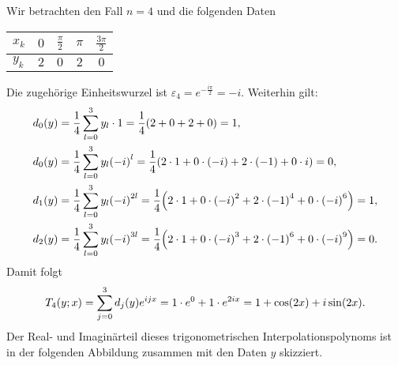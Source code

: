 \documentclass{lecture}
\begin{document}
    \begin{example}
        Wir betrachten den Fall \(n = 4\) und die folgenden Daten
        \begin{center}
            \begin{tabular}{lcccc}
                \toprule
                \(x_k\) & \(0\) & \(\frac{\pi}{2}\) & \(\pi\) & \(\frac{3\pi}{2}\)\\
                \midrule
                \(y_k\) & \(2\) & \(0\) & \(2\) & \(0\)\\
                \bottomrule
            \end{tabular}
        \end{center}
        Die zugehörige Einheitswurzel ist \(\varepsilon_4 = e^{-\frac{i\pi}{2}} = -i\).
        Weiterhin gilt:
        \begin{align*}
            d_0\parentheses*{y} &= \frac{1}{4}\sum_{l = 0}^3 y_l \cdot 1 = \frac{1}{4}\parentheses*{2 + 0 + 2 + 0} = 1,\\
            d_0\parentheses*{y} &= \frac{1}{4}\sum_{l = 0}^3 y_l\parentheses*{-i}^l = \frac{1}{4}\parentheses*{2 \cdot 1 + 0 \cdot \parentheses*{-i} + 2 \cdot \parentheses*{-1} + 0 \cdot i} = 0,\\
            d_1\parentheses*{y} &= \frac{1}{4}\sum_{l = 0}^3 y_l\parentheses*{-i}^{2l} = \frac{1}{4}\parentheses*{2 \cdot 1 + 0 \cdot \parentheses*{-i}^2 + 2 \cdot \parentheses*{-1}^4 + 0 \cdot \parentheses*{-i}^6} = 1,\\
            d_2\parentheses*{y} &= \frac{1}{4}\sum_{l = 0}^3 y_l\parentheses*{-i}^{3l} = \frac{1}{4}\parentheses*{2 \cdot 1 + 0 \cdot \parentheses*{-i}^3 + 2 \cdot \parentheses*{-1}^6 + 0 \cdot \parentheses*{-i}^9} = 0.
        \end{align*}
        Damit folgt
        \[
            T_4\parentheses*{y; x} = \sum_{j = 0}^3 d_j\parentheses*{y}e^{ijx} = 1 \cdot e^0 + 1 \cdot e^{2ix} = 1 + \cos\parentheses*{2x} + i\sin\parentheses*{2x}.
        \]
        Der Real- und Imaginärteil dieses trigonometrischen Interpolationspolynoms ist in der folgenden Abbildung zusammen mit den Daten \(y\) skizziert.
        \begin{center}
\end{center}
\end{example}
\end{document}
